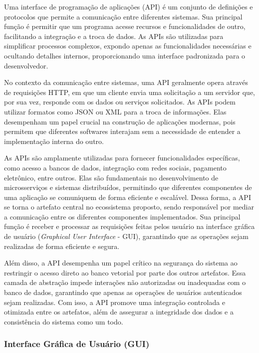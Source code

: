 \documentclass[a4paper, 12pt]{article}
\begin{document}
    Uma interface de programação de aplicações (API) é um conjunto de definições e protocolos que permite a comunicação entre diferentes sistemas. Sua principal função é permitir que um programa acesse recursos e funcionalidades de outro, facilitando a integração e a troca de dados. As APIs são utilizadas para simplificar processos complexos, expondo apenas as funcionalidades necessárias e ocultando detalhes internos, proporcionando uma interface padronizada para o desenvolvedor.

    No contexto da comunicação entre sistemas, uma API geralmente opera através de requisições HTTP, em que um cliente envia uma solicitação a um servidor que, por sua vez, responde com os dados ou serviços solicitados. As APIs podem utilizar formatos como JSON ou XML para a troca de informações. Elas desempenham um papel crucial na construção de aplicações modernas, pois permitem que diferentes softwares interajam sem a necessidade de entender a implementação interna do outro.

    As APIs são amplamente utilizadas para fornecer funcionalidades específicas, como acesso a bancos de dados, integração com redes sociais, pagamento eletrônico, entre outros. Elas são fundamentais no desenvolvimento de microsserviços e sistemas distribuídos, permitindo que diferentes componentes de uma aplicação se comuniquem de forma eficiente e escalável. Dessa forma, a API se torna o artefato central no ecossistema proposto, sendo responsável por mediar a comunicação entre os diferentes componentes implementados. Sua principal função é receber e processar as requisições feitas pelos usuário na interface gráfica de usuário (\textit{Graphical User Interface} - GUI), garantindo que as operações sejam realizadas de forma eficiente e segura.
    
    Além disso, a API desempenha um papel crítico na segurança do sistema ao restringir o acesso direto ao banco vetorial por parte dos outros artefatos. Essa camada de abstração impede interações não autorizadas ou inadequadas com o banco de dados, garantindo que apenas as operações de usuários autenticados sejam realizadas. Com isso, a API promove uma integração controlada e otimizada entre os artefatos, além de assegurar a integridade dos dados e a consistência do sistema como um todo.
    
    \subsubsection{Interface Gráfica de Usuário (GUI)} \label{sec:gui}
    
\end{document}
